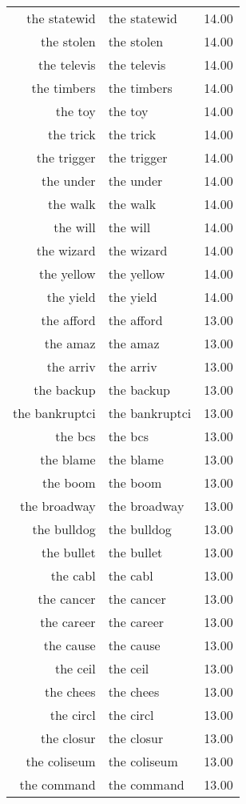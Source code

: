 \begin{table}[ht]
\begin{tabular}{rlr}
  the statewid & the statewid & 14.00 \\ 
  the stolen & the stolen & 14.00 \\ 
  the televis & the televis & 14.00 \\ 
  the timbers & the timbers & 14.00 \\ 
  the toy & the toy & 14.00 \\ 
  the trick & the trick & 14.00 \\ 
  the trigger & the trigger & 14.00 \\ 
  the under & the under & 14.00 \\ 
  the walk & the walk & 14.00 \\ 
  the will & the will & 14.00 \\ 
  the wizard & the wizard & 14.00 \\ 
  the yellow & the yellow & 14.00 \\ 
  the yield & the yield & 14.00 \\ 
  the afford & the afford & 13.00 \\ 
  the amaz & the amaz & 13.00 \\ 
  the arriv & the arriv & 13.00 \\ 
  the backup & the backup & 13.00 \\ 
  the bankruptci & the bankruptci & 13.00 \\ 
  the bcs & the bcs & 13.00 \\ 
  the blame & the blame & 13.00 \\ 
  the boom & the boom & 13.00 \\ 
  the broadway & the broadway & 13.00 \\ 
  the bulldog & the bulldog & 13.00 \\ 
  the bullet & the bullet & 13.00 \\ 
  the cabl & the cabl & 13.00 \\ 
  the cancer & the cancer & 13.00 \\ 
  the career & the career & 13.00 \\ 
  the cause & the cause & 13.00 \\ 
  the ceil & the ceil & 13.00 \\ 
  the chees & the chees & 13.00 \\ 
  the circl & the circl & 13.00 \\ 
  the closur & the closur & 13.00 \\ 
  the coliseum & the coliseum & 13.00 \\ 
  the command & the command & 13.00 \\ 

\end{tabular}
\end{table}
